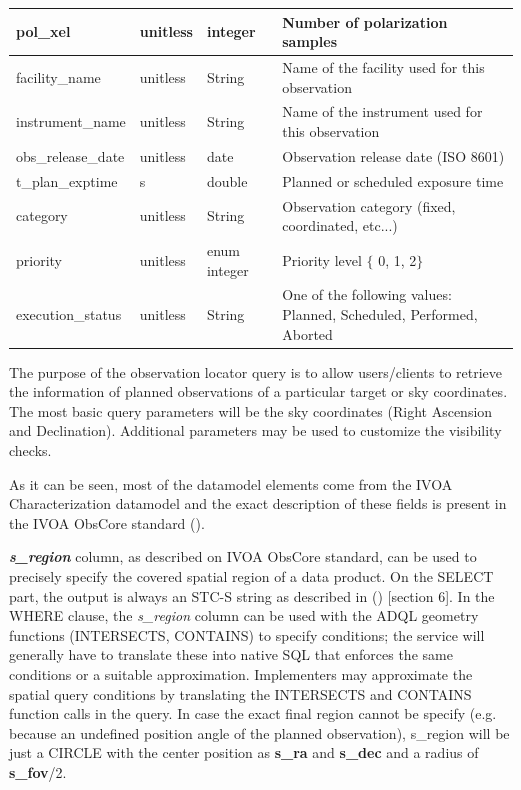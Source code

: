 \documentclass[11pt,a4paper]{ivoa}
\begin{document}
\begin{landscape}
\begin{table}
\begin{tabular}{ |l|l|l|l| }
\hline
pol\_xel & 
unitless & 
integer & 
Number of polarization samples \\
\hline
facility\_name & 
unitless & 
String & 
Name of the facility used for this observation \\
\hline
instrument\_name & 
unitless & 
String & 
Name of the instrument used for this observation \\
\hline
obs\_release\_date & 
unitless & 
date & 
Observation release date (ISO 8601) \\
\hline
t\_plan\_exptime & 
s & 
double & 
Planned or scheduled exposure time \\
\hline
category & 
unitless & 
String & 
Observation category (fixed, coordinated, etc...) \\
\hline
priority & 
unitless & 
enum integer & 
Priority level $ \{ $ 0, 1, 2$ \} $ \\
\hline
execution\_status & 
unitless & 
String & 
One of the following values:  Planned, Scheduled, Performed, Aborted \\
\hline
\end{tabular}
\end{table}
\end{landscape}


The purpose of the observation locator query is to allow users/clients to retrieve the information of planned observations of a particular target or sky coordinates. The most basic query parameters will be the sky coordinates (Right Ascension and Declination). Additional parameters may be used to customize the visibility checks.

As it can be seen, most of the datamodel elements come from the IVOA Characterization datamodel and the exact description of these fields is present in the IVOA ObsCore standard (\cite{Lou17}).

\textbf{\textit{s\_region}} column, as described on IVOA ObsCore standard, can be used to precisely specify the covered spatial region of a data product. On the SELECT part, the output is always an STC-S string as described in (\cite{TAP}) [section 6]. In the WHERE clause, the \textit{s\_region} column can be used with the ADQL geometry functions (INTERSECTS, CONTAINS) to specify conditions; the service will generally have to translate these into native SQL that enforces the same conditions or a suitable approximation. Implementers may approximate the spatial query conditions by translating the INTERSECTS and CONTAINS function calls in the query. In case the exact final region cannot be specify (e.g. because an undefined position angle of the planned observation), s\_region will be just a CIRCLE with the center position as \textbf{s\_ra} and \textbf{s\_dec} and a radius of \textbf{s\_fov}/2.
\end{document}
